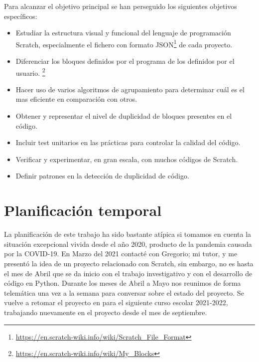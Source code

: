 \documentclass[a4paper, 12pt]{book}
\begin{document}
Para alcanzar el objetivo principal se han perseguido los siguientes objetivos específicos:


\begin{itemize}
  	\item Estudiar la estructura visual y funcional del lenguaje de programación Scratch, especialmente el fichero con formato JSON\footnote{\url{https://en.scratch-wiki.info/wiki/Scratch_File_Format}} de cada proyecto.
  	\item Diferenciar los bloques definidos por el programa de los definidos por el usuario. \footnote{\url{https://en.scratch-wiki.info/wiki/My_Blocks}}
  	\item Hacer uso de varios algoritmos de agrupamiento para determinar cuál es el mas eficiente en comparación con otros.
  	\item Obtener y representar el nivel de duplicidad de bloques presentes en el código. 	
 	\item Incluir test unitarios en las prácticas para controlar la calidad del código.  	
	\item Verificar y experimentar, en gran escala, con muchos códigos de Scratch.
	\item Definir patrones en la detección de duplicidad de código.
\end{itemize}

\section{Planificación temporal}
\label{sec:planificacion-temporal}


La planificación de este trabajo ha sido bastante atípica si tomamos en cuenta la situación excepcional vivida desde el año 2020, producto de la pandemia causada por la COVID-19. En Marzo del 2021 contacté con Gregorio; mi tutor, y me presentó la idea de un proyecto relacionado con Scratch, sin embargo, no es hasta el mes de Abril que se da inicio con el trabajo investigativo y con el desarrollo de código en Python. Durante los meses de Abril a Mayo nos reunimos de forma telemática una vez a la semana para conversar sobre el estado del proyecto. Se vuelve a retomar el proyecto en para el siguiente curso escolar 2021-2022, trabajando nuevamente en el proyecto desde el mes de septiembre.
\end{document}
